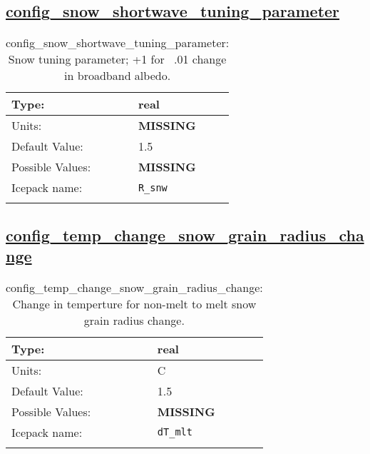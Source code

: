 \subsection[config\_snow\_shortwave\_tuning\_parameter]{\hyperref[sec:nm_tab_shortwave]{config\_snow\_shortwave\_tuning\_parameter}}
\label{subsec:nm_sec_config_snow_shortwave_tuning_parameter}
\begin{center}
\begin{longtable}{| p{2.0in} || p{4.0in} |}
    \hline
    Type: & real \\
    \hline
    Units: & {\bf \color{red} MISSING} \\
    \hline
    Default Value: & 1.5 \\
    \hline
    Possible Values: & {\bf \color{red} MISSING} \\
    \hline
    Icepack name: & \verb+R_snw+ \\
    \hline
    \caption{config\_snow\_shortwave\_tuning\_parameter: Snow tuning parameter; +1 for ~.01 change in broadband albedo.}
\end{longtable}
\end{center}
\subsection[config\_temp\_change\_snow\_grain\_radius\_change]{\hyperref[sec:nm_tab_shortwave]{config\_temp\_change\_snow\_grain\_radius\_change}}
\label{subsec:nm_sec_config_temp_change_snow_grain_radius_change}
\begin{center}
\begin{longtable}{| p{2.0in} || p{4.0in} |}
    \hline
    Type: & real \\
    \hline
    Units: & \si{C} \\
    \hline
    Default Value: & 1.5 \\
    \hline
    Possible Values: & {\bf \color{red} MISSING} \\
    \hline
    Icepack name: & \verb+dT_mlt+ \\
    \hline
    \caption{config\_temp\_change\_snow\_grain\_radius\_change: Change in temperture for non-melt to melt snow grain radius change.}
\end{longtable}
\end{center}
